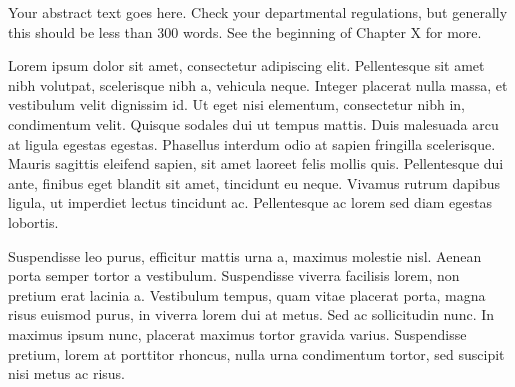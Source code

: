 Your abstract text goes here.  Check your departmental regulations, but generally this should be less than 300 words.  See the beginning of Chapter X for more.

Lorem ipsum dolor sit amet, consectetur adipiscing elit. Pellentesque sit amet nibh volutpat, scelerisque nibh a, vehicula neque. Integer placerat nulla massa, et vestibulum velit dignissim id. Ut eget nisi elementum, consectetur nibh in, condimentum velit. Quisque sodales dui ut tempus mattis. Duis malesuada arcu at ligula egestas egestas. Phasellus interdum odio at sapien fringilla scelerisque. Mauris sagittis eleifend sapien, sit amet laoreet felis mollis quis. Pellentesque dui ante, finibus eget blandit sit amet, tincidunt eu neque. Vivamus rutrum dapibus ligula, ut imperdiet lectus tincidunt ac. Pellentesque ac lorem sed diam egestas lobortis.

Suspendisse leo purus, efficitur mattis urna a, maximus molestie nisl. Aenean porta semper tortor a vestibulum. Suspendisse viverra facilisis lorem, non pretium erat lacinia a. Vestibulum tempus, quam vitae placerat porta, magna risus euismod purus, in viverra lorem dui at metus. Sed ac sollicitudin nunc. In maximus ipsum nunc, placerat maximus tortor gravida varius. Suspendisse pretium, lorem at porttitor rhoncus, nulla urna condimentum tortor, sed suscipit nisi metus ac risus.


